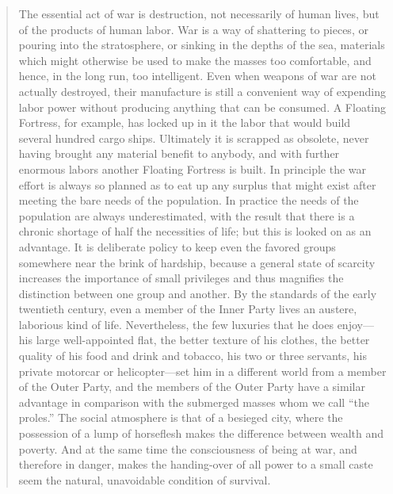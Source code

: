 \begin{quotation}
The essential act of war is destruction, not necessarily of human lives,
but of the products of human labor. War is a way of shattering to
pieces, or pouring into the stratosphere, or sinking in the depths of
the sea, materials which might otherwise be used to make the masses too
comfortable, and hence, in the long run, too intelligent. Even when
weapons of war are not actually destroyed, their manufacture is still a
convenient way of expending labor power without producing anything that
can be consumed. A Floating Fortress, for example, has locked up in it
the labor that would build several hundred cargo ships. Ultimately it is
scrapped as obsolete, never having brought any material benefit to
anybody, and with further enormous labors another Floating Fortress is
built. In principle the war effort is always so planned as to eat up any
surplus that might exist after meeting the bare needs of the population.
In practice the needs of the population are always underestimated, with
the result that there is a chronic shortage of half the necessities of
life; but this is looked on as an advantage. It is deliberate policy to
keep even the favored groups somewhere near the brink of hardship,
because a general state of scarcity increases the importance of small
privileges and thus magnifies the distinction between one group and
another. By the standards of the early twentieth century, even a member
of the Inner Party lives an austere, laborious kind of life.
Nevertheless, the few luxuries that he does enjoy---his large
well-appointed flat, the better texture of his clothes, the better
quality of his food and drink and tobacco, his two or three servants,
his private motorcar or helicopter---set him in a different world from a
member of the Outer Party, and the members of the Outer Party have a
similar advantage in comparison with the submerged masses whom we call
``the proles.'' The social atmosphere is that of a besieged city, where
the possession of a lump of horseflesh makes the difference between
wealth and poverty. And at the same time the consciousness of being at
war, and therefore in danger, makes the handing-over of all power to a
small caste seem the natural, unavoidable condition of survival.
\end{quotation}

